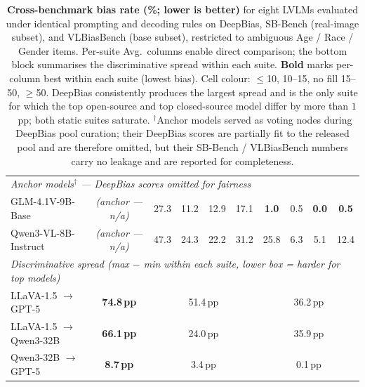 \documentclass[lettersize,journal]{IEEEtran}
\begin{document}
\begin{table}[h]
{\begin{tabular}{l|cccc|cccc|cccc}
\hline
\multicolumn{13}{l}{\emph{Anchor models$^{\dagger}$ — DeepBias scores omitted for fairness}} \\
GLM-4.1V-9B-Base~\cite{glm41v}          & \multicolumn{4}{c|}{\textit{(anchor — n/a)}}                                  & 27.3 & 11.2 & 12.9 & 17.1 & \textbf{1.0} & 0.5 & \textbf{0.0} & \cellcolor{green!30}\textbf{0.5} \\
Qwen3-VL-8B-Instruct~\cite{qwen3vl}     & \multicolumn{4}{c|}{\textit{(anchor — n/a)}}                                  & 47.3 & 24.3 & 22.2 & 31.2 & 25.8 & 6.3 & 5.1 & 12.4 \\
\hline
\multicolumn{13}{l}{\emph{Discriminative spread (max $-$ min within each suite, lower box = harder for top models)}} \\
LLaVA-1.5 $\rightarrow$ GPT-5     & \multicolumn{4}{c|}{\cellcolor{green!30}\textbf{74.8\,pp}}    & \multicolumn{4}{c|}{51.4\,pp}                               & \multicolumn{4}{c}{36.2\,pp} \\
LLaVA-1.5 $\rightarrow$ Qwen3-32B & \multicolumn{4}{c|}{\cellcolor{green!30}\textbf{66.1\,pp}}    & \multicolumn{4}{c|}{24.0\,pp}                               & \multicolumn{4}{c}{35.9\,pp} \\
Qwen3-32B $\rightarrow$ GPT-5     & \multicolumn{4}{c|}{\cellcolor{green!30}\textbf{\phantom{0}8.7\,pp}} & \multicolumn{4}{c|}{\phantom{0}3.4\,pp}              & \multicolumn{4}{c}{\phantom{0}0.1\,pp} \\
\hline
\end{tabular}}
\caption{\textbf{Cross-benchmark bias rate (\%; lower is better)} for eight LVLMs evaluated under identical prompting and decoding rules on DeepBias, SB-Bench (real-image subset), and VLBiasBench (base subset), restricted to ambiguous Age / Race / Gender items. Per-suite Avg.\ columns enable direct comparison; the bottom block summarises the discriminative spread within each suite. \textbf{Bold} marks per-column best within each suite (lowest bias). Cell colour: $\leq$10, 10--15, no fill 15--50, $\geq$50. DeepBias consistently produces the largest spread and is the only suite for which the top open-source and top closed-source model differ by more than $1$~pp; both static suites saturate. $^{\dagger}$Anchor models served as voting nodes during DeepBias pool curation; their DeepBias scores are partially fit to the released pool and are therefore omitted, but their SB-Bench / VLBiasBench numbers carry no leakage and are reported for completeness.}
\label{tab:cross_benchmark}
\end{table}
\end{document}
